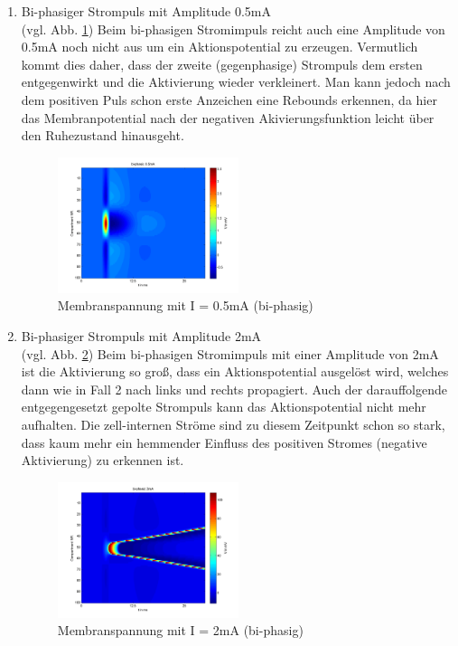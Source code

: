 \documentclass[conference]{IEEEtran}
\begin{document}
\begin{enumerate}
\item Bi-phasiger Strompuls mit Amplitude 0.5mA\\ (vgl. Abb. \ref{fig:bi_05_1}) Beim bi-phasigen Stromimpuls reicht auch eine Amplitude von 0.5mA noch nicht aus um ein Aktionspotential zu erzeugen. Vermutlich kommt dies daher, dass der zweite (gegenphasige) Strompuls dem ersten entgegenwirkt und die Aktivierung wieder verkleinert. Man kann jedoch nach dem positiven Puls schon erste Anzeichen eine Rebounds erkennen, da hier das Membranpotential nach der negativen Akivierungsfunktion leicht über den Ruhezustand hinausgeht.
\begin{figure}[h!]
	\centering
	\vspace{-10pt}
	\includegraphics[width=0.5\textwidth]{img/bi_05_1.png}
	\vspace{-30pt}
	\caption{Membranspannung mit I = 0.5mA (bi-phasig)}
	\vspace{-5pt}
	\label{fig:bi_05_1}
	
\end{figure}

\item Bi-phasiger Strompuls mit Amplitude 2mA\\ (vgl. Abb. \ref{fig:bi_2_1}) Beim bi-phasigen Stromimpuls mit einer Amplitude von 2mA ist die Aktivierung so groß, dass ein Aktionspotential ausgelöst wird, welches dann wie in Fall 2 nach links und rechts propagiert. Auch der darauffolgende entgegengesetzt gepolte Strompuls kann das Aktionspotential nicht mehr aufhalten. Die zell-internen Ströme sind zu diesem Zeitpunkt schon so stark, dass kaum mehr ein hemmender Einfluss des positiven Stromes (negative Aktivierung) zu erkennen ist.
\begin{figure}[h!]
	\centering
	\vspace{-10pt}
	\includegraphics[width=0.5\textwidth]{img/bi_2_1.png}
	\vspace{-30pt}
	\caption{Membranspannung mit I = 2mA (bi-phasig)}
	\vspace{-5pt}
	\label{fig:bi_2_1}
\end{figure}


\end{enumerate}
\end{document}
